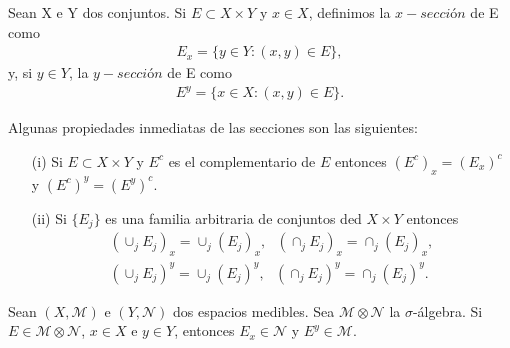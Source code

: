 \begin{defi}
Sean X e Y dos conjuntos. Si $E \subset X \times Y$ y $x \in X$, definimos la $x-sección$ de E como
\begin{align*}
    E_x = \{ y \in Y : (x,y) \in E \},
\end{align*}
y, si $y \in Y$, la $y-sección$ de E como
\begin{align*}
    E^y = \{ x \in X : (x,y) \in E \}.
\end{align*}
\end{defi}
Algunas propiedades inmediatas de las secciones son las siguientes:
\begin{enumerate}
    \item[(i)] Si $E \subset X \times Y$ y $E^c$ es el complementario de $E$ entonces $(E^c)_x = (E_x)^c$ y $(E^c)^y = (E^y)^c$.
    \item[(ii)] Si $\{E_j\}$ es una familia arbitraria de conjuntos ded $X \times Y$ entonces
    \begin{align*}
        (\cup_j E_j)_x = \cup_j (E_j)_x, \ \ \ (\cap_j E_j)_x = \cap_j (E_j)_x,\\
        (\cup_j E_j)^y = \cup_j (E_j)^y, \ \ \ (\cap_j E_j)^y = \cap_j (E_j)^y.
    \end{align*}
\end{enumerate}
\begin{prop}
Sean $(X, \mathcal{M})$ e $(Y, \mathcal{N})$ dos espacios medibles. Sea $\mathcal{M} \otimes \mathcal{N}$ la $\sigma$-álgebra. Si $E \in \mathcal{M} \otimes \mathcal{N}$, $x \in X$ e $y \in Y$, entonces $E_x \in \mathcal{N}$ y $E^y \in \mathcal{M}$.
\end{prop}

